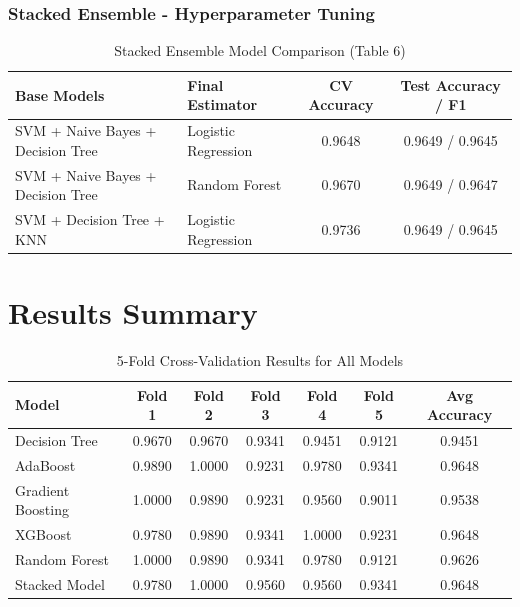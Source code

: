 \documentclass[12pt]{article}
\begin{document}
\subsubsection*{Stacked Ensemble - Hyperparameter Tuning}

\begin{table}[H] 
    \centering
    \caption{Stacked Ensemble Model Comparison (Table 6)}
    \label{tab:stacking_summary}
    \begin{tabular}{p{5.5cm} l c c}
        \toprule
        \textbf{Base Models} & \textbf{Final Estimator} & \textbf{CV Accuracy} & \textbf{Test Accuracy / F1} \\
        \midrule
        SVM + Naive Bayes + Decision Tree & Logistic Regression & 0.9648 & 0.9649 / 0.9645 \\
        SVM + Naive Bayes + Decision Tree & Random Forest       & 0.9670 & 0.9649 / 0.9647 \\
        SVM + Decision Tree + KNN         & Logistic Regression & 0.9736 & 0.9649 / 0.9645 \\
        \bottomrule
    \end{tabular}
\end{table}


\section{Results Summary}

\begin{table}[H]
    \centering
    \caption{5-Fold Cross-Validation Results for All Models }
    \label{tab:final_results}
    \begin{tabular}{lcccccc}
        \toprule
        \textbf{Model} & \textbf{Fold 1} & \textbf{Fold 2} & \textbf{Fold 3} & \textbf{Fold 4} & \textbf{Fold 5} & \textbf{Avg Accuracy} \\
        \midrule
        Decision Tree     & 0.9670 & 0.9670 & 0.9341 & 0.9451 & 0.9121 & 0.9451 \\
        AdaBoost          & 0.9890 & 1.0000 & 0.9231 & 0.9780 & 0.9341 & 0.9648 \\
        Gradient Boosting & 1.0000 & 0.9890 & 0.9231 & 0.9560 & 0.9011 & 0.9538 \\
        XGBoost           & 0.9780 & 0.9890 & 0.9341 & 1.0000 & 0.9231 & 0.9648 \\
        Random Forest     & 1.0000 & 0.9890 & 0.9341 & 0.9780 & 0.9121 & 0.9626 \\
        Stacked Model     & 0.9780 & 1.0000 & 0.9560 & 0.9560 & 0.9341 & 0.9648 \\
        \bottomrule
    \end{tabular}
\end{table}
\end{document}
